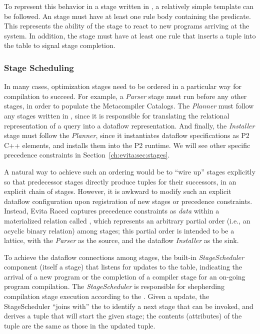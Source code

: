 To represent this behavior in a stage written in \OVERLOG, a relatively simple
template can be followed.  An \OVERLOG stage must have at least one rule body
containing the  predicate.  This represents the
ability of the stage to react to new programs arriving at the system.  In
addition, the stage must have at least one rule that inserts a 
tuple into the  table to signal stage completion.

\subsubsection{Stage Scheduling}
\label{ch:evita:sec:stageschedule}

In many cases, optimization stages need to be ordered in a particular way for
compilation to succeed.  For example, a {\em Parser} stage must run before any
other stages, in order to populate the Metacompiler Catalogs.  The {\em
Planner} must follow any stages written in \OVERLOG, since it is responsible
for translating the relational representation of a query into a dataflow
representation.  And finally, the {\em Installer} stage must follow the {\em
Planner}, since it instantiates dataflow specifications as P2 C++ elements, and
installs them into the P2 runtime.  We will see other specific precedence
constraints in Section~\ref{ch:evita:sec:stages}.

A natural way to achieve such an ordering would be to ``wire up'' stages
explicitly so that predecessor stages directly produce
 tuples for their successors, in an explicit chain of
stages.  However, it is awkward to modify such an explicit dataflow
configuration upon registration of new stages or precedence constraints.
Instead, Evita Raced captures precedence constraints as {\em data} within a
materialized relation called , which represents an arbitrary
partial order (i.e., an acyclic binary relation) among stages; this partial
order is intended to be a lattice, with the {\em Parser} as the source, and the
dataflow {\em Installer} as the sink.  
 
To achieve the dataflow connections among stages, the built-in {\em
StageScheduler} component (itself a stage) that listens for updates to the
 table, indicating the arrival of a new \OVERLOG program or the
completion of a compiler stage for an on-going program compilation.  The {\em
StageScheduler} is responsible for shepherding compilation stage execution
according to the .  Given a  update, the
StageScheduler ``joins with'' the  to identify a next stage
that can be invoked, and derives a  tuple that will
start the given stage; the contents (attributes) of the
 tuple are the same as those in the updated
 tuple.


